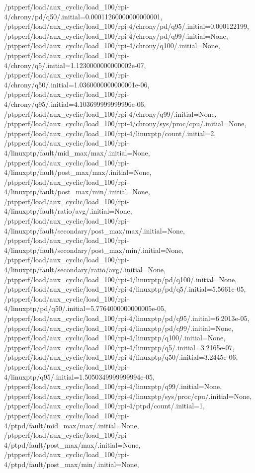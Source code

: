 {    /ptpperf/load/aux_cyclic/load_100/rpi-4/chrony/pd/q50/.initial=0.00011260000000000001,
    /ptpperf/load/aux_cyclic/load_100/rpi-4/chrony/pd/q95/.initial=0.000122199,
    /ptpperf/load/aux_cyclic/load_100/rpi-4/chrony/pd/q99/.initial=None,
    /ptpperf/load/aux_cyclic/load_100/rpi-4/chrony/q100/.initial=None,
    /ptpperf/load/aux_cyclic/load_100/rpi-4/chrony/q5/.initial=1.1230000000000002e-07,
    /ptpperf/load/aux_cyclic/load_100/rpi-4/chrony/q50/.initial=1.0360000000000001e-06,
    /ptpperf/load/aux_cyclic/load_100/rpi-4/chrony/q95/.initial=4.103699999999996e-06,
    /ptpperf/load/aux_cyclic/load_100/rpi-4/chrony/q99/.initial=None,
    /ptpperf/load/aux_cyclic/load_100/rpi-4/chrony/sys/proc/cpu/.initial=None,
    /ptpperf/load/aux_cyclic/load_100/rpi-4/linuxptp/count/.initial=2,
    /ptpperf/load/aux_cyclic/load_100/rpi-4/linuxptp/fault/mid_max/max/.initial=None,
    /ptpperf/load/aux_cyclic/load_100/rpi-4/linuxptp/fault/post_max/max/.initial=None,
    /ptpperf/load/aux_cyclic/load_100/rpi-4/linuxptp/fault/post_max/min/.initial=None,
    /ptpperf/load/aux_cyclic/load_100/rpi-4/linuxptp/fault/ratio/avg/.initial=None,
    /ptpperf/load/aux_cyclic/load_100/rpi-4/linuxptp/fault/secondary/post_max/max/.initial=None,
    /ptpperf/load/aux_cyclic/load_100/rpi-4/linuxptp/fault/secondary/post_max/min/.initial=None,
    /ptpperf/load/aux_cyclic/load_100/rpi-4/linuxptp/fault/secondary/ratio/avg/.initial=None,
    /ptpperf/load/aux_cyclic/load_100/rpi-4/linuxptp/pd/q100/.initial=None,
    /ptpperf/load/aux_cyclic/load_100/rpi-4/linuxptp/pd/q5/.initial=5.5661e-05,
    /ptpperf/load/aux_cyclic/load_100/rpi-4/linuxptp/pd/q50/.initial=5.7764000000000005e-05,
    /ptpperf/load/aux_cyclic/load_100/rpi-4/linuxptp/pd/q95/.initial=6.2013e-05,
    /ptpperf/load/aux_cyclic/load_100/rpi-4/linuxptp/pd/q99/.initial=None,
    /ptpperf/load/aux_cyclic/load_100/rpi-4/linuxptp/q100/.initial=None,
    /ptpperf/load/aux_cyclic/load_100/rpi-4/linuxptp/q5/.initial=3.2165e-07,
    /ptpperf/load/aux_cyclic/load_100/rpi-4/linuxptp/q50/.initial=3.2445e-06,
    /ptpperf/load/aux_cyclic/load_100/rpi-4/linuxptp/q95/.initial=1.5050349999999994e-05,
    /ptpperf/load/aux_cyclic/load_100/rpi-4/linuxptp/q99/.initial=None,
    /ptpperf/load/aux_cyclic/load_100/rpi-4/linuxptp/sys/proc/cpu/.initial=None,
    /ptpperf/load/aux_cyclic/load_100/rpi-4/ptpd/count/.initial=1,
    /ptpperf/load/aux_cyclic/load_100/rpi-4/ptpd/fault/mid_max/max/.initial=None,
    /ptpperf/load/aux_cyclic/load_100/rpi-4/ptpd/fault/post_max/max/.initial=None,
    /ptpperf/load/aux_cyclic/load_100/rpi-4/ptpd/fault/post_max/min/.initial=None,
}
